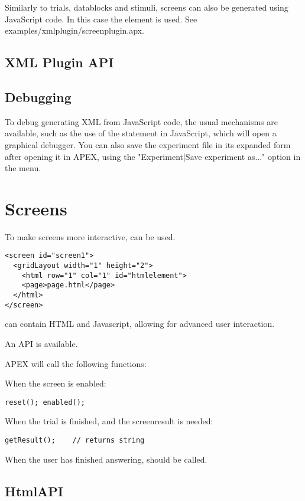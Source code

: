 Similarly to trials, datablocks and stimuli, screens can also be generated using JavaScript code. In this case the  element is used. See examples/xmlplugin/screenplugin.apx.

\subsection{XML Plugin API}
\label{sec:xmlpluginapi}





\subsection{Debugging}

To debug generating XML from JavaScript code, the usual mechanisms are available, such as the use of the  statement in JavaScript, which will open a graphical debugger. You can also save the experiment file in its expanded form after opening it in APEX, using the "Experiment|Save experiment as..." option in the menu.


\section{Screens} 

To make screens more interactive,  can be used.

\begin{lstlisting}
<screen id="screen1">
  <gridLayout width="1" height="2">
    <html row="1" col="1" id="htmlelement">
    <page>page.html</page>
  </html>
</screen>
\end{lstlisting}

 can contain HTML and Javascript, allowing for advanced user interaction.


An API is available.

APEX will call the following functions:

When the screen is enabled:

\begin{lstlisting}
reset(); enabled();
\end{lstlisting}


When the trial is finished, and the screenresult is needed:

\begin{lstlisting}
getResult();    // returns string
\end{lstlisting}


When the user has finished answering,  should be called.



\subsection{HtmlAPI}


